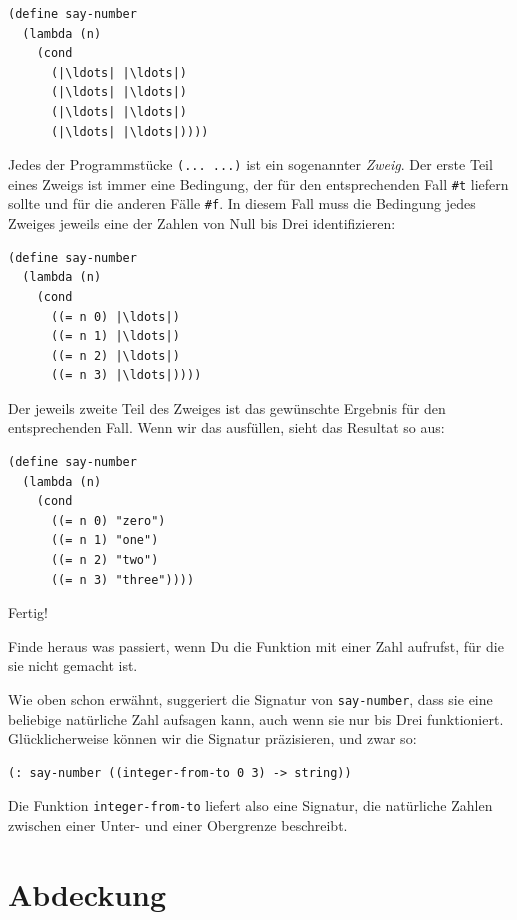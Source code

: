 \begin{lstlisting}
(define say-number
  (lambda (n)
    (cond
      (|\ldots| |\ldots|)
      (|\ldots| |\ldots|)
      (|\ldots| |\ldots|)
      (|\ldots| |\ldots|))))
\end{lstlisting}
%
Jedes der Programmstücke \lstinline{(... ...)} ist ein sogenannter
\textit{Zweig}.  Der erste Teil eines Zweigs ist immer
eine Bedingung, der für den entsprechenden Fall \lstinline{#t} liefern
sollte und für die anderen Fälle \lstinline{#f}.  In diesem Fall muss die
Bedingung jedes Zweiges jeweils eine der Zahlen von Null bis Drei
identifizieren:
%
\begin{lstlisting}
(define say-number
  (lambda (n)
    (cond
      ((= n 0) |\ldots|)
      ((= n 1) |\ldots|)
      ((= n 2) |\ldots|)
      ((= n 3) |\ldots|))))
\end{lstlisting}
%
Der jeweils zweite Teil des Zweiges ist das gewünschte Ergebnis für
den entsprechenden Fall.  Wenn wir das ausfüllen, sieht das Resultat
so aus:
%
\begin{lstlisting}
(define say-number
  (lambda (n)
    (cond
      ((= n 0) "zero")
      ((= n 1) "one")
      ((= n 2) "two")
      ((= n 3) "three"))))
\end{lstlisting}
%
Fertig!
\begin{aufgabeinline}
  Finde heraus was passiert, wenn Du die Funktion mit einer Zahl
  aufrufst, für die sie nicht gemacht ist.
\end{aufgabeinline}
%
Wie oben schon erwähnt, suggeriert die Signatur von
\lstinline{say-number}, dass sie eine beliebige natürliche Zahl
aufsagen kann, auch wenn sie nur bis Drei funktioniert.
Glücklicherweise können wir die Signatur präzisieren, und zwar so:
%
\begin{lstlisting}
(: say-number ((integer-from-to 0 3) -> string))
\end{lstlisting}
%
Die Funktion
\lstinline{integer-from-to}
liefert also eine Signatur, die natürliche Zahlen zwischen einer Unter-
und einer Obergrenze beschreibt.\label{function:integer-from-to}

\section{Abdeckung}
\label{sec:testabdeckung}

